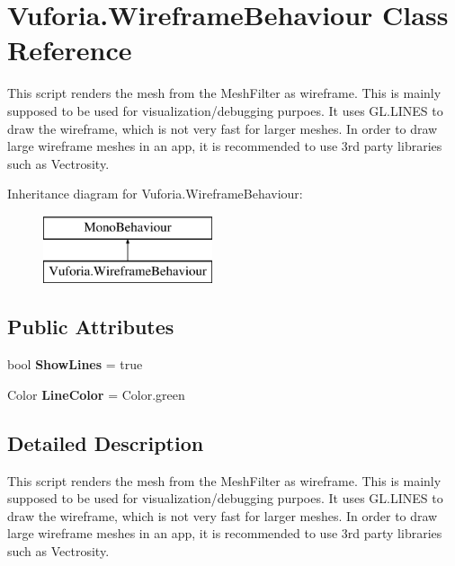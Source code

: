 \hypertarget{class_vuforia_1_1_wireframe_behaviour}{}\section{Vuforia.\+Wireframe\+Behaviour Class Reference}
\label{class_vuforia_1_1_wireframe_behaviour}


This script renders the mesh from the Mesh\+Filter as wireframe. This is mainly supposed to be used for visualization/debugging purpoes. It uses G\+L.\+L\+I\+N\+E\+S to draw the wireframe, which is not very fast for larger meshes. In order to draw large wireframe meshes in an app, it is recommended to use 3rd party libraries such as Vectrosity.  


Inheritance diagram for Vuforia.\+Wireframe\+Behaviour\+:\begin{figure}[H]
\begin{center}
\leavevmode
\includegraphics[height=2.000000cm]{class_vuforia_1_1_wireframe_behaviour}
\end{center}
\end{figure}
\subsection*{Public Attributes}
\begin{DoxyCompactItemize}
\item 
\hypertarget{class_vuforia_1_1_wireframe_behaviour_acdd6f0fb44f3cf08576404bab3472fca}{}bool {\bfseries Show\+Lines} = true\label{class_vuforia_1_1_wireframe_behaviour_acdd6f0fb44f3cf08576404bab3472fca}

\item 
\hypertarget{class_vuforia_1_1_wireframe_behaviour_a34c138f570846e24bf6d4172e1128085}{}Color {\bfseries Line\+Color} = Color.\+green\label{class_vuforia_1_1_wireframe_behaviour_a34c138f570846e24bf6d4172e1128085}

\end{DoxyCompactItemize}


\subsection{Detailed Description}
This script renders the mesh from the Mesh\+Filter as wireframe. This is mainly supposed to be used for visualization/debugging purpoes. It uses G\+L.\+L\+I\+N\+E\+S to draw the wireframe, which is not very fast for larger meshes. In order to draw large wireframe meshes in an app, it is recommended to use 3rd party libraries such as Vectrosity. 

